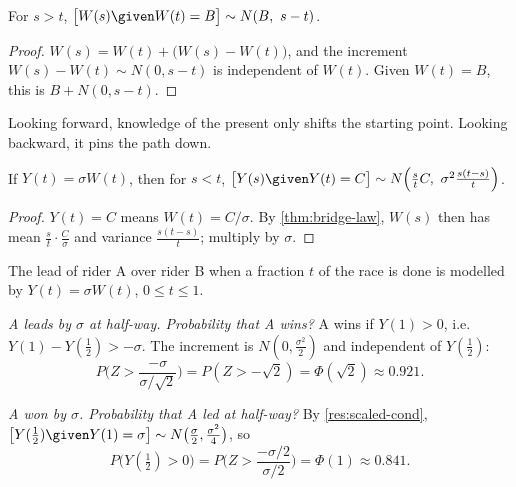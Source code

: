 \begin{result}[$W(s)$ given $W(t)=B$, for $s>t$]
\label{res:after}
For $s>t$, $\big[W(s)\given W(t)=B\big]\sim N(B,\ s-t)$.
\end{result}
\begin{proof}
$W(s)=W(t)+\big(W(s)-W(t)\big)$, and the increment $W(s)-W(t)\sim N(0,s-t)$ is independent of $W(t)$. Given $W(t)=B$, this is $B+N(0,s-t)$.
\end{proof}

Looking forward, knowledge of the present only shifts the starting point. Looking backward, it pins the path down.

\begin{result}
\label{res:scaled-cond}
If $Y(t)=\sigma W(t)$, then for $s<t$, $\big[Y(s)\given Y(t)=C\big]\sim N\Big(\frac stC,\ \sigma^2\frac{s(t-s)}{t}\Big)$.
\end{result}
\begin{proof}
$Y(t)=C$ means $W(t)=C/\sigma$. By \cref{thm:bridge-law}, $W(s)$ then has mean $\frac st\cdot\frac C\sigma$ and variance $\frac{s(t-s)}{t}$; multiply by $\sigma$.
\end{proof}

\begin{example}
\label{ex:race}
The lead of rider A over rider B when a fraction $t$ of the race is done is modelled by $Y(t)=\sigma W(t)$, $0\le t\le1$.
\begin{steps}
  \item \emph{A leads by $\sigma$ at half-way. Probability that A wins?} A wins if $Y(1)>0$, i.e.\ $Y(1)-Y(\frac12)>-\sigma$. The increment is $N(0,\frac{\sigma^2}{2})$ and independent of $Y(\frac12)$:
  \[
    P\Big(Z>\frac{-\sigma}{\sigma/\sqrt2}\Big)=P(Z>-\sqrt2)=\Phi(\sqrt2)\approx0.921 .
  \]
  \item \emph{A won by $\sigma$. Probability that A led at half-way?} By \cref{res:scaled-cond}, $\big[Y(\frac12)\given Y(1)=\sigma\big]\sim N\big(\frac\sigma2,\frac{\sigma^2}{4}\big)$, so
  \[
    P\Big(Y(\tfrac12)>0\Big)=P\Big(Z>\frac{-\sigma/2}{\sigma/2}\Big)=\Phi(1)\approx0.841 .
  \]
\end{steps}
\end{example}



